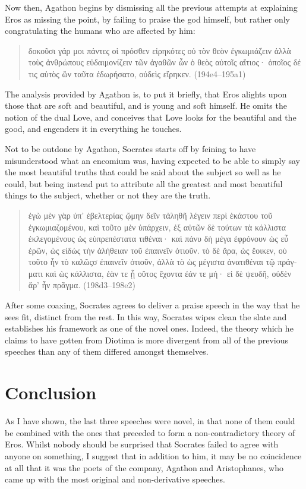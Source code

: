 Now then, Agathon begins by dismissing all the previous attempts at
explaining Eros as missing the point, by failing to praise the god
himself, but rather only congratulating the humans who are affected by
him:

\begin{quote}
\textgreek{δοκοῦσι γάρ μοι πάντες οἱ πρόσθεν εἰρηκότες οὐ τὸν θεὸν
ἐγκωμιάζειν ἀλλὰ τοὺς ἀνθρώπους εὐδαιμονίζειν τῶν ἀγαθῶν ὧν ὁ θεὸς
αὐτοῖς αἴτιος· ὁποῖος δέ τις αὐτὸς ὢν ταῦτα ἐδωρήσατο, οὐδεὶς
εἴρηκεν.} (194e4--195a1)
\end{quote}

The analysis provided by Agathon is, to put it briefly, that Eros
alights upon those that are soft and beautiful, and is young and soft
himself. He omits the notion of the dual Love, and conceives that Love
looks for the beautiful and the good, and engenders it in everything he
touches.

Not to be outdone by Agathon, Socrates starts off by feining to have
misunderstood what an encomium was, having expected to be able to simply
say the most beautiful truths that could be said about the subject so
well as he could, but being instead put to attribute all the greatest
and most beautiful things to the subject, whether or not they are the
truth.

\begin{quote}
\textgreek{ἐγὼ μὲν γὰρ ὑπ' ἐβελτερίας ᾤμην δεῖν τἀληθῆ λέγειν περὶ
ἑκάστου τοῦ ἐγκωμιαζομένου, καὶ τοῦτο μὲν ὑπάρχειν, ἐξ αὐτῶν δὲ τούτων
τὰ κάλλιστα ἐκλεγομένους ὡς εὐπρεπέστατα τιθέναι· καὶ πάνυ δὴ μέγα
ἐφρόνουν ὡς εὖ ἐρῶν, ὡς εἰδὼς τὴν ἀλήθειαν τοῦ ἐπαινεῖν ὁτιοῦν. τὸ δὲ
ἄρα, ὡς ἔοικεν, οὐ τοῦτο ἦν τὸ καλῶςσ ἐπαινεῖν ὁτιοῦν, ἀλλὰ τὸ ὡς
μέγιστα ἀνατιθέναι τῷ πράγματι καὶ ὡς κάλλιστα, ἐὰν τε ᾖ οὕτος ἔχοντα
ἐάν τε μή· εἰ δὲ ψευδῆ, οὐδὲν ἄρ' ἦν πρᾶγμα.} (198d3--198e2)
\end{quote}

After some coaxing, Socrates agrees to deliver a praise speech in the
way that he sees fit, distinct from the rest. In this way, Socrates
wipes clean the slate and establishes his framework as one of the novel
ones. Indeed, the theory which he claims to have gotten from Diotima is
more divergent from all of the previous speeches than any of them
differed amongst themselves.

\section{Conclusion}

As I have shown, the last three speeches were novel, in that none of
them could be combined with the ones that preceded to form a
non-contradictory theory of Eros. Whilst nobody should be surprised that
Socrates failed to agree with anyone on something, I suggest that in
addition to him, it may be no coincidence at all that it was the poets
of the company, Agathon and Aristophanes, who came up with the most
original and non-derivative speeches.
